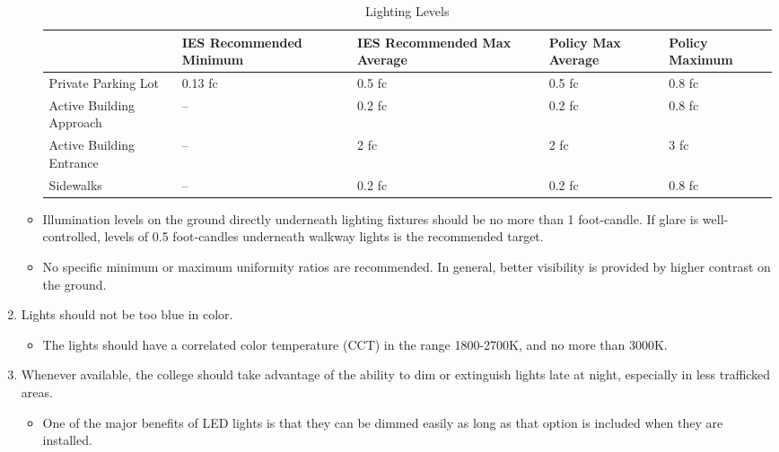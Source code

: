 \documentclass[12pt, oneside]{article}
\begin{document}
\begin{enumerate}
\begin{itemize}
\begin{table}[p]
\begin{center}
\label{levels}
\begin{tabular}{| p{7em} | p{7em} | p{7em} | p{5em} | p{5em} |}
\hline
                         & IES Recommended Minimum & IES Recommended Max Average & Policy Max Average & Policy Maximum \\ \hline
Private Parking Lot      & 0.13 fc                 & 0.5 fc                      & 0.5 fc             & 0.8 fc         \\ \hline
Active Building Approach & --                      & 0.2 fc                      & 0.2 fc             & 0.8 fc         \\ \hline
Active Building Entrance & --                      & 2 fc                        & 2 fc               & 3 fc           \\ \hline
Sidewalks                & --                      & 0.2 fc                      & 0.2 fc             & 0.8 fc         \\ \hline
\end{tabular}
\caption{Lighting Levels}
\end{center}
\end{table}

\item Illumination levels on the ground directly underneath lighting fixtures should be no more than 1 foot-candle. If glare is well-controlled, levels of 0.5 foot-candles underneath walkway lights is the recommended target.
\item No specific minimum or maximum uniformity ratios are recommended. In general, better visibility is provided by higher contrast on the ground.

\end{itemize}
\item Lights should not be too blue in color.
\begin{itemize}
\item The lights should have a correlated color temperature (CCT) in the range 1800-2700K, and no more than 3000K.
\end{itemize}
\item Whenever available, the college should take advantage of the ability to dim or extinguish lights late at night, especially in less trafficked areas.
\begin{itemize}
\item One of the major benefits of LED lights is that they can be dimmed easily as long as that option is included when they are installed. 
\end{itemize}
\end{enumerate}
\end{document}
